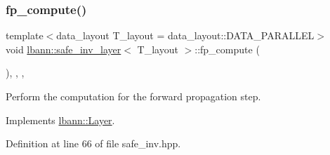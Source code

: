 \subsubsection{\texorpdfstring{fp\+\_\+compute()}{fp\_compute()}}
{\footnotesize\ttfamily template$<$data\+\_\+layout T\+\_\+layout = data\+\_\+layout\+::\+D\+A\+T\+A\+\_\+\+P\+A\+R\+A\+L\+L\+EL$>$ \\
void \hyperlink{classlbann_1_1safe__inv__layer}{lbann\+::safe\+\_\+inv\+\_\+layer}$<$ T\+\_\+layout $>$\+::fp\+\_\+compute (\begin{DoxyParamCaption}{ }\end{DoxyParamCaption})\hspace{0.3cm}{\ttfamily [inline]}, {\ttfamily [override]}, {\ttfamily [protected]}, {\ttfamily [virtual]}}

Perform the computation for the forward propagation step. 

Implements \hyperlink{classlbann_1_1Layer_a523319dd1bd87a0612afa1912bb5aad7}{lbann\+::\+Layer}.



Definition at line 66 of file safe\+\_\+inv.\+hpp.


